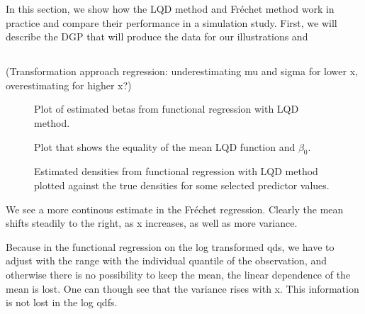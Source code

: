 In this section, we show how the LQD method and Fréchet method work in practice and
compare their performance in a simulation study. First, we will describe the DGP that
will produce the data for our illustrations and 

\subsection{}











(Transformation approach regression: underestimating mu and sigma for lower x,
overestimating for higher x?) \textcite{PetersenLiuDivani2021}



\begin{figure}[h]
    \centering
    \resizebox{1\textwidth}{!}{}
    \caption[Estimated betas in LQD functional regression]{Plot of estimated betas from
    functional regression with LQD method.}
    \label{fig:betas}
\end{figure}

\begin{figure}[h]
    \centering
    \resizebox{1\textwidth}{!}{}
    \caption[Equality of mean LQD function and $\beta_0$]{Plot that shows the equality
    of the mean LQD function and $\beta_0$.}
    \label{fig:beta0vsmean}
\end{figure}

\begin{figure}[h]
    \centering
    \resizebox{1\textwidth}{!}{}
    \caption[Comparison: estimated vs. true densities --- LQD]{Estimated densities from
    functional regression with LQD method plotted against the true densities for some
    selected predictor values.}
    \label{fig:func_est_vs_true}
\end{figure}




We see a more continous estimate in the Fréchet regression. Clearly the mean shifts
steadily to the right, as x increases, as well as more variance.

Because in the functional regression on the log transformed qds, we have to adjust with
the range with the individual quantile of the observation, and otherwise there is no
possibility to keep the mean, the linear dependence of the mean is lost. One can though
see that the variance rises with x. This information is not lost in the log qdfs.


